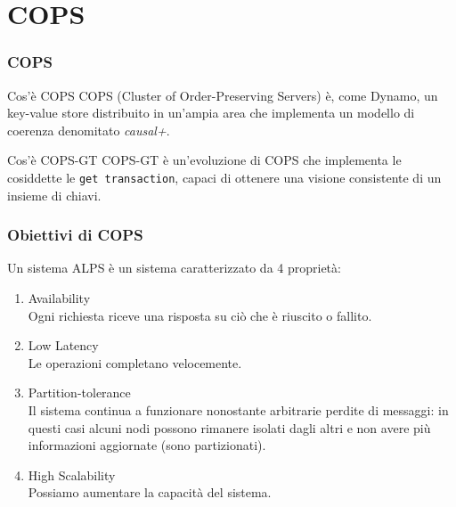 \section{COPS}
\begin{frame}
\frametitle{COPS}
\begin{block}{Cos'è COPS}
COPS (Cluster of Order-Preserving Servers) è, come Dynamo,
un key-value store distribuito in un'ampia area che implementa un modello di coerenza
denomitato \textit{causal+}.
\end{block}
\begin{block}{Cos'è COPS-GT}
COPS-GT è un'evoluzione di COPS che implementa le cosiddette le \texttt{get transaction},
capaci di ottenere una visione consistente di un insieme di chiavi.
\end{block}
\end{frame}

\begin{frame}
\frametitle{Obiettivi di COPS}
	\begin{definizione}
	Un \alert{sistema ALPS} è un sistema caratterizzato da 4 proprietà:
	\begin{enumerate}
		\item<1-> Availability \\
				  Ogni richiesta riceve una risposta su ciò che è riuscito o fallito.
		\item<1-> Low Latency \\
				  Le operazioni completano velocemente.
		\item<1-> Partition-tolerance \\
				  Il sistema continua a funzionare nonostante arbitrarie perdite di messaggi:
				  in questi casi alcuni nodi possono rimanere isolati dagli altri e non avere
				  più informazioni aggiornate (sono partizionati).
		\item<1-> High Scalability \\
				  Possiamo aumentare la capacità del sistema.
	\end{enumerate}
	\end{definizione}
\end{frame}


